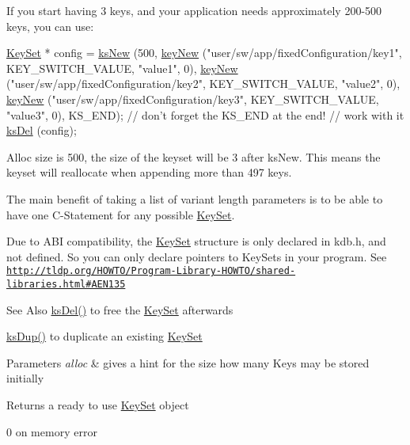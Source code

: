 If you start having 3 keys, and your application needs approximately 200-\/500 keys, you can use\-: 
\begin{DoxyCode}
\hyperlink{classkdb_1_1KeySet_a4eac9850fa4f06c07a5306befc3e4377}{KeySet} * config = \hyperlink{group__keyset_ga671e1aaee3ae9dc13b4834a4ddbd2c3c}{ksNew} (500,
        \hyperlink{group__key_gaf6893c038b3ebee90c73a9ea8356bebf}{keyNew} (\textcolor{stringliteral}{"user/sw/app/fixedConfiguration/key1"}, KEY\_SWITCH\_VALUE, \textcolor{stringliteral}{
      "value1"}, 0),
        \hyperlink{group__key_gaf6893c038b3ebee90c73a9ea8356bebf}{keyNew} (\textcolor{stringliteral}{"user/sw/app/fixedConfiguration/key2"}, KEY\_SWITCH\_VALUE, \textcolor{stringliteral}{
      "value2"}, 0),
        \hyperlink{group__key_gaf6893c038b3ebee90c73a9ea8356bebf}{keyNew} (\textcolor{stringliteral}{"user/sw/app/fixedConfiguration/key3"}, KEY\_SWITCH\_VALUE, \textcolor{stringliteral}{
      "value3"}, 0),
        KS\_END); \textcolor{comment}{// don't forget the KS\_END at the end!}
\textcolor{comment}{// work with it}
\hyperlink{group__keyset_ga27e5c16473b02a422238c8d970db7ac8}{ksDel} (config);
\end{DoxyCode}
 Alloc size is 500, the size of the keyset will be 3 after ks\-New. This means the keyset will reallocate when appending more than 497 keys.

The main benefit of taking a list of variant length parameters is to be able to have one C-\/\-Statement for any possible \hyperlink{classkdb_1_1KeySet}{Key\-Set}.

Due to A\-B\-I compatibility, the {\ttfamily \hyperlink{classkdb_1_1KeySet}{Key\-Set}} structure is only declared in kdb.\-h, and not defined. So you can only declare {\ttfamily pointers} to {\ttfamily Key\-Sets} in your program. See \href{http://tldp.org/HOWTO/Program-Library-HOWTO/shared-libraries.html#AEN135}{\tt http\-://tldp.\-org/\-H\-O\-W\-T\-O/\-Program-\/\-Library-\/\-H\-O\-W\-T\-O/shared-\/libraries.\-html\#\-A\-E\-N135}

\begin{DoxySeeAlso}{See Also}
\hyperlink{group__keyset_ga27e5c16473b02a422238c8d970db7ac8}{ks\-Del()} to free the \hyperlink{group__keyset}{Key\-Set} afterwards 

\hyperlink{group__keyset_gac59e4b328245463f1451f68d5106151c}{ks\-Dup()} to duplicate an existing \hyperlink{group__keyset}{Key\-Set} 
\end{DoxySeeAlso}

\begin{DoxyParams}{Parameters}
{\em alloc} & gives a hint for the size how many Keys may be stored initially \\
\hline
\end{DoxyParams}
\begin{DoxyReturn}{Returns}
a ready to use \hyperlink{classkdb_1_1KeySet}{Key\-Set} object 

0 on memory error 
\end{DoxyReturn}


